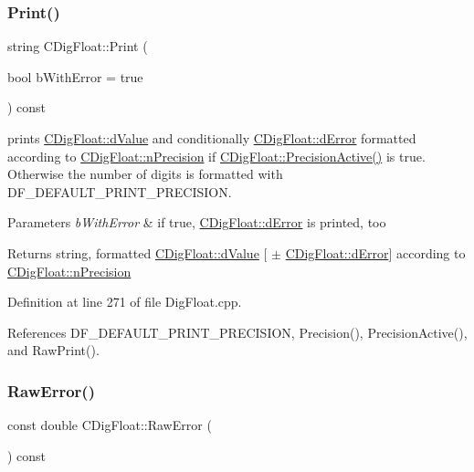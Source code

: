 \subsubsection{\texorpdfstring{Print()}{Print()}}
{\footnotesize\ttfamily string C\+Dig\+Float\+::\+Print (\begin{DoxyParamCaption}\item[{bool}]{b\+With\+Error = {\ttfamily true} }\end{DoxyParamCaption}) const}



prints \hyperlink{classCDigFloat_a4bbe69e30dd4e20527362493aa9aaf96}{C\+Dig\+Float\+::d\+Value} and conditionally \hyperlink{classCDigFloat_a25eb3782d1e727ff007a48f8308e3d4d}{C\+Dig\+Float\+::d\+Error} formatted according to \hyperlink{classCDigFloat_ad580654be35246d14c91482581c0bc11}{C\+Dig\+Float\+::n\+Precision} if \hyperlink{classCDigFloat_a4d6ca24beda280be719374c2a6b2c64d}{C\+Dig\+Float\+::\+Precision\+Active()} is true. Otherwise the number of digits is formatted with D\+F\+\_\+\+D\+E\+F\+A\+U\+L\+T\+\_\+\+P\+R\+I\+N\+T\+\_\+\+P\+R\+E\+C\+I\+S\+I\+ON. 


\begin{DoxyParams}{Parameters}
{\em b\+With\+Error} & if true, \hyperlink{classCDigFloat_a25eb3782d1e727ff007a48f8308e3d4d}{C\+Dig\+Float\+::d\+Error} is printed, too \\
\hline
\end{DoxyParams}
\begin{DoxyReturn}{Returns}
string, formatted \hyperlink{classCDigFloat_a4bbe69e30dd4e20527362493aa9aaf96}{C\+Dig\+Float\+::d\+Value} \mbox{[} $\pm$ \hyperlink{classCDigFloat_a25eb3782d1e727ff007a48f8308e3d4d}{C\+Dig\+Float\+::d\+Error}\mbox{]} according to \hyperlink{classCDigFloat_ad580654be35246d14c91482581c0bc11}{C\+Dig\+Float\+::n\+Precision} 
\end{DoxyReturn}


Definition at line 271 of file Dig\+Float.\+cpp.



References D\+F\+\_\+\+D\+E\+F\+A\+U\+L\+T\+\_\+\+P\+R\+I\+N\+T\+\_\+\+P\+R\+E\+C\+I\+S\+I\+ON, Precision(), Precision\+Active(), and Raw\+Print().

\mbox{\label{classCDigFloat_a9805530caa01cc722cfbe8912689daa7}} 
\subsubsection{\texorpdfstring{Raw\+Error()}{RawError()}}
{\footnotesize\ttfamily const double C\+Dig\+Float\+::\+Raw\+Error (\begin{DoxyParamCaption}{ }\end{DoxyParamCaption}) const\hspace{0.3cm}{\ttfamily [inline]}}



